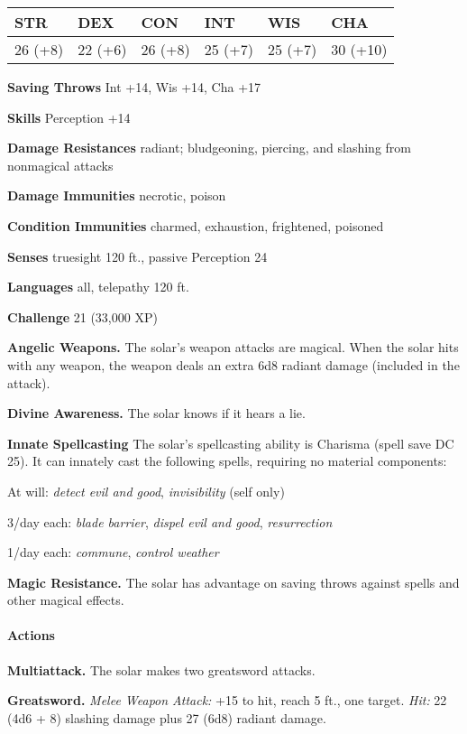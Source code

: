 \documentclass[
]{article}
\begin{document}
\begin{longtable}[]{@{}llllll@{}}
\toprule
STR & DEX & CON & INT & WIS & CHA\tabularnewline
\midrule
\endhead
26 (+8) & 22 (+6) & 26 (+8) & 25 (+7) & 25 (+7) & 30
(+10)\tabularnewline
\bottomrule
\end{longtable}

\textbf{Saving Throws} Int +14, Wis +14, Cha +17

\textbf{Skills} Perception +14

\textbf{Damage Resistances} radiant; bludgeoning, piercing, and slashing
from nonmagical attacks

\textbf{Damage Immunities} necrotic, poison

\textbf{Condition Immunities} charmed, exhaustion, frightened, poisoned

\textbf{Senses} truesight 120 ft., passive Perception 24

\textbf{Languages} all, telepathy 120 ft.

\textbf{Challenge} 21 (33,000 XP)

\textbf{Angelic Weapons.} The solar's weapon attacks are magical. When
the solar hits with any weapon, the weapon deals an extra 6d8 radiant
damage (included in the attack).

\textbf{Divine Awareness.} The solar knows if it hears a lie.

\textbf{Innate Spellcasting} The solar's spellcasting ability is
Charisma (spell save DC 25). It can innately cast the following spells,
requiring no material components:

At will: \emph{detect evil and good}, \emph{invisibility} (self only)

3/day each: \emph{blade barrier}, \emph{dispel evil and good},
\emph{resurrection}

1/day each: \emph{commune}, \emph{control weather}

\textbf{Magic Resistance.} The solar has advantage on saving throws
against spells and other magical effects.

\hypertarget{actions-3}{%
\paragraph{Actions}\label{actions-3}}

\textbf{Multiattack.} The solar makes two greatsword attacks.

\textbf{Greatsword.} \emph{Melee Weapon Attack:} +15 to hit, reach 5
ft., one target. \emph{Hit:} 22 (4d6 + 8) slashing damage plus 27 (6d8)
radiant damage.
\end{document}
